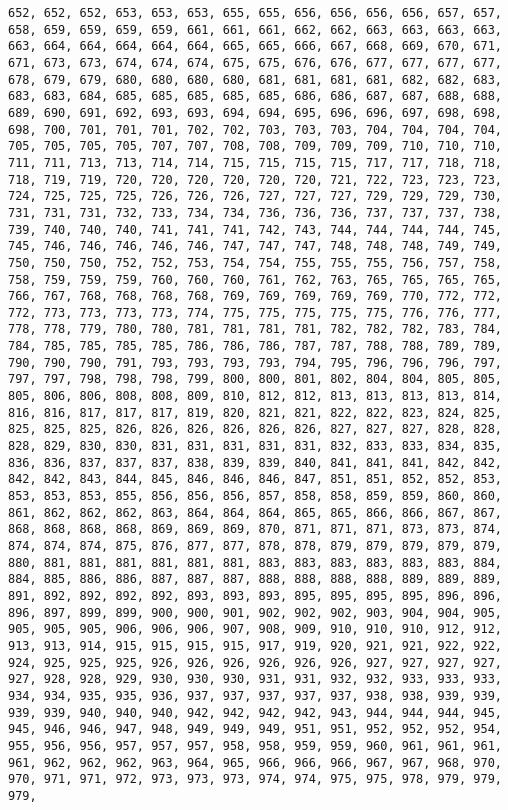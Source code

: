 \documentclass[11pt]{article}
\begin{document}
\begin{Verbatim}[commandchars=\\\{\}]
652, 652, 652, 653, 653, 653, 655, 655, 656, 656, 656, 656, 657, 657, 658, 659, 659, 659, 659, 661, 661, 661, 662, 662, 663, 663, 663, 663, 663, 664, 664, 664, 664, 664, 665, 665, 666, 667, 668, 669, 670, 671, 671, 673, 673, 674, 674, 674, 675, 675, 676, 676, 677, 677, 677, 677, 678, 679, 679, 680, 680, 680, 680, 681, 681, 681, 681, 682, 682, 683, 683, 683, 684, 685, 685, 685, 685, 685, 686, 686, 687, 687, 688, 688, 689, 690, 691, 692, 693, 693, 694, 694, 695, 696, 696, 697, 698, 698, 698, 700, 701, 701, 701, 702, 702, 703, 703, 703, 704, 704, 704, 704, 705, 705, 705, 705, 707, 707, 708, 708, 709, 709, 709, 710, 710, 710, 711, 711, 713, 713, 714, 714, 715, 715, 715, 715, 717, 717, 718, 718, 718, 719, 719, 720, 720, 720, 720, 720, 720, 721, 722, 723, 723, 723, 724, 725, 725, 725, 726, 726, 726, 727, 727, 727, 729, 729, 729, 730, 731, 731, 731, 732, 733, 734, 734, 736, 736, 736, 737, 737, 737, 738, 739, 740, 740, 740, 741, 741, 741, 742, 743, 744, 744, 744, 744, 745, 745, 746, 746, 746, 746, 746, 747, 747, 747, 748, 748, 748, 749, 749, 750, 750, 750, 752, 752, 753, 754, 754, 755, 755, 755, 756, 757, 758, 758, 759, 759, 759, 760, 760, 760, 761, 762, 763, 765, 765, 765, 765, 766, 767, 768, 768, 768, 768, 769, 769, 769, 769, 769, 770, 772, 772, 772, 773, 773, 773, 773, 774, 775, 775, 775, 775, 775, 776, 776, 777, 778, 778, 779, 780, 780, 781, 781, 781, 781, 782, 782, 782, 783, 784, 784, 785, 785, 785, 785, 786, 786, 786, 787, 787, 788, 788, 789, 789, 790, 790, 790, 791, 793, 793, 793, 793, 794, 795, 796, 796, 796, 797, 797, 797, 798, 798, 798, 799, 800, 800, 801, 802, 804, 804, 805, 805, 805, 806, 806, 808, 808, 809, 810, 812, 812, 813, 813, 813, 813, 814, 816, 816, 817, 817, 817, 819, 820, 821, 821, 822, 822, 823, 824, 825, 825, 825, 825, 826, 826, 826, 826, 826, 826, 827, 827, 827, 828, 828, 828, 829, 830, 830, 831, 831, 831, 831, 831, 832, 833, 833, 834, 835, 836, 836, 837, 837, 837, 838, 839, 839, 840, 841, 841, 841, 842, 842, 842, 842, 843, 844, 845, 846, 846, 846, 847, 851, 851, 852, 852, 853, 853, 853, 853, 855, 856, 856, 856, 857, 858, 858, 859, 859, 860, 860, 861, 862, 862, 862, 863, 864, 864, 864, 865, 865, 866, 866, 867, 867, 868, 868, 868, 868, 869, 869, 869, 870, 871, 871, 871, 873, 873, 874, 874, 874, 874, 875, 876, 877, 877, 878, 878, 879, 879, 879, 879, 879, 880, 881, 881, 881, 881, 881, 881, 883, 883, 883, 883, 883, 883, 884, 884, 885, 886, 886, 887, 887, 887, 888, 888, 888, 888, 889, 889, 889, 891, 892, 892, 892, 892, 893, 893, 893, 895, 895, 895, 895, 896, 896, 896, 897, 899, 899, 900, 900, 901, 902, 902, 902, 903, 904, 904, 905, 905, 905, 905, 906, 906, 906, 907, 908, 909, 910, 910, 910, 912, 912, 913, 913, 914, 915, 915, 915, 915, 917, 919, 920, 921, 921, 922, 922, 924, 925, 925, 925, 926, 926, 926, 926, 926, 926, 927, 927, 927, 927, 927, 928, 928, 929, 930, 930, 930, 931, 931, 932, 932, 933, 933, 933, 934, 934, 935, 935, 936, 937, 937, 937, 937, 937, 938, 938, 939, 939, 939, 939, 940, 940, 940, 942, 942, 942, 942, 943, 944, 944, 944, 945, 945, 946, 946, 947, 948, 949, 949, 949, 951, 951, 952, 952, 952, 954, 955, 956, 956, 957, 957, 957, 958, 958, 959, 959, 960, 961, 961, 961, 961, 962, 962, 962, 963, 964, 965, 966, 966, 966, 967, 967, 968, 970, 970, 971, 971, 972, 973, 973, 973, 974, 974, 975, 975, 978, 979, 979, 979, 
\end{Verbatim}
\end{document}
